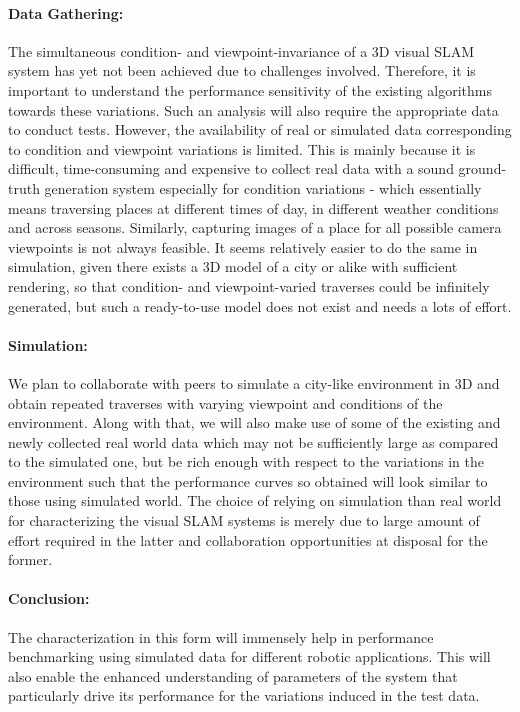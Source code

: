 \documentclass{article}
\begin{document}
\paragraph{Data Gathering:}The simultaneous condition- and viewpoint-invariance of a 3D visual SLAM system has yet not been achieved due to challenges involved. Therefore, it is important to understand the performance sensitivity of the existing algorithms towards these variations. Such an analysis will also require the appropriate data to conduct tests. However, the availability of real or simulated data corresponding to condition and viewpoint variations is limited. This is mainly because it is difficult, time-consuming and expensive to collect real data with a sound ground-truth generation system especially for condition variations - which essentially means traversing places at different times of day, in different weather conditions and across seasons. Similarly, capturing images of a place for all possible camera viewpoints is not always feasible. It seems relatively easier to do the same in simulation, given there exists a 3D model of a city or alike with sufficient rendering, so that condition- and viewpoint-varied traverses could be infinitely generated, but such a ready-to-use model does not exist and needs a lots of effort.

\paragraph{Simulation:}We plan to collaborate with peers to simulate a city-like environment in 3D and obtain repeated traverses with varying viewpoint and conditions of the environment. Along with that, we will also make use of some of the existing and newly collected real world data which may not be sufficiently large as compared to the simulated one, but be rich enough with respect to the variations in the environment such that the performance curves so obtained will look similar to those using simulated world. The choice of relying on simulation than real world for characterizing the visual SLAM systems is merely due to large amount of effort required in the latter and collaboration opportunities at disposal for the former. 

\paragraph{Conclusion:}The characterization in this form will immensely help in performance benchmarking using simulated data for different robotic applications. This will also enable the enhanced understanding of parameters of the system that particularly drive its performance for the variations induced in the test data.
\end{document}
